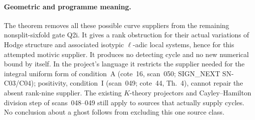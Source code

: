 \paragraph{Geometric and programme meaning.}
The theorem removes all these possible curve suppliers from the
remaining nonsplit-sixfold gate Q2i.  It gives a rank obstruction
for their actual variations of Hodge structure and associated
isotypic $\ell$-adic local systems, hence for this attempted
motivic supplier.  It produces no detecting cycle and no new
numerical bound by itself.  In the project's language it restricts
the supplier needed for the integral uniform form of condition~A
(cote~16, scan~050; SIGN\_NEXT SN-C03/C04); positivity, condition~I
(scan~049; cote~44, Th.~4), cannot repair the absent rank-nine
supplier.  The existing $K$-theory projectors and Cayley--Hamilton
division step of scans~048--049 still apply to sources that
actually supply cycles.  No conclusion about a ghost follows
from excluding this one source class.
